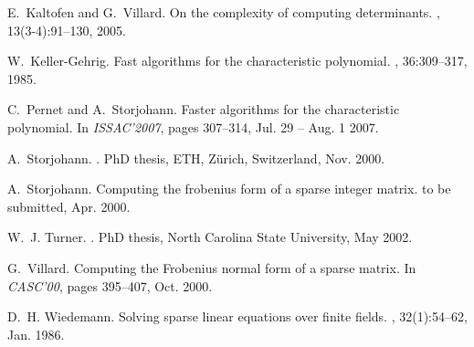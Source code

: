 \documentclass{article}
\begin{document}
{\begin{thebibliography}{10}
E.~Kaltofen and G.~Villard.
\newblock On the complexity of computing determinants.
, 13(3-4):91--130, 2005.

W.~Keller-Gehrig.
\newblock Fast algorithms for the characteristic polynomial.
, 36:309--317, 1985.

C.~Pernet and A.~Storjohann.
\newblock Faster algorithms for the characteristic polynomial.
\newblock In {\em {ISSAC}'2007}, pages 307--314, Jul. 29 -- Aug. 1 2007.

A.~Storjohann.
.
\newblock PhD thesis, ETH, Z{\"u}rich, Switzerland, Nov. 2000.

A.~Storjohann.
\newblock Computing the frobenius form of a sparse integer matrix.
\newblock to be submitted, Apr. 2000.

W.~J. Turner.
.
\newblock PhD thesis, North Carolina State University, May 2002.

G.~Villard.
\newblock Computing the {Frobenius} normal form of a sparse matrix.
\newblock In {\em CASC'00}, pages 395--407, Oct. 2000.

D.~H. Wiedemann.
\newblock Solving sparse linear equations over finite fields.
, 32(1):54--62, Jan.
  1986.

\end{thebibliography}
}
\end{document}
